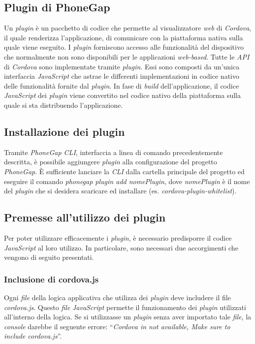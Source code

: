 \subsection{Plugin di PhoneGap}

Un \textit{plugin} è un pacchetto di codice che permette al visualizzatore \textit{web} di \textit{Cordova}, il quale renderizza l'applicazione, di comunicare con la piattaforma nativa sulla quale viene eseguito. I \textit{plugin} forniscono accesso alle funzionalità del dispositivo che normalmente non sono disponibili per le applicazioni \textit{web-based}. Tutte le \textit{API} di \textit{Cordova} sono implementate tramite \textit{plugin}. Essi sono composti da un'unica interfaccia \textit{JavaScript} che astrae le differenti implementazioni in codice nativo delle funzionalità fornite dal \textit{plugin}. In fase di \textit{build} dell'applicazione, il codice \textit{JavaScript} dei \textit{plugin} viene convertito nel codice nativo della piattaforma sulla quale si sta distribuendo l'applicazione.

\subsection{Installazione dei plugin}

Tramite \textit{PhoneGap CLI}, interfaccia a linea di comando precedentemente descritta, è possibile aggiungere \textit{plugin} alla configurazione del progetto \textit{PhoneGap}. È sufficiente lanciare la \textit{CLI} dalla cartella principale del progetto ed eseguire il comando \textit{phonegap plugin add nomePlugin}, dove \textit{nomePlugin} è il nome del \textit{plugin} che si desidera scaricare ed installare (es. \textit{cordova-plugin-whitelist}).

\subsection{Premesse all'utilizzo dei plugin}

Per poter utilizzare efficacemente i \textit{plugin}, è necessario predisporre il codice \textit{JavaScript} al loro utilizzo. In particolare, sono necessari due accorgimenti che vengono di seguito presentati.

\subsubsection{Inclusione di cordova.js}

Ogni \textit{file} della logica applicativa che utilizza dei \textit{plugin} deve includere il file \textit{cordova.js}. Questo \textit{file} \textit{JavaScript} permette il funzionamento dei \textit{plugin} utilizzati all'interno della logica. Se si utilizzasse un \textit{plugin} senza aver importato tale \textit{file}, la \textit{console} darebbe il seguente errore: ``\textit{Cordova in not available, Make sure to include cordova.js}''.

